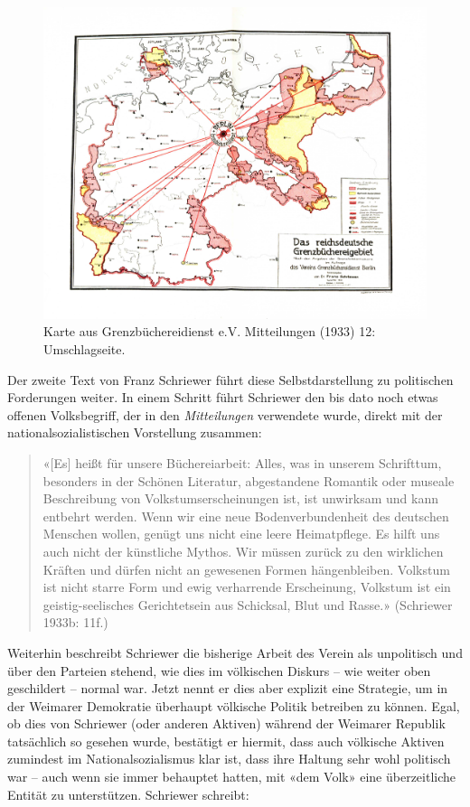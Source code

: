 \documentclass[a4paper,
fontsize=11pt,
oneside,
numbers=noperiodatend,
parskip=half-,
bibliography=totoc,
final
]{scrartcl}
\begin{document}
\begin{figure}
\centering
\includegraphics{img/karte_reichsdeutsche.jpg}
\caption{Karte aus Grenzbüchereidienst e.V. Mitteilungen (1933) 12:
Umschlagseite.}
\end{figure}

Der zweite Text von Franz Schriewer führt diese Selbstdarstellung zu
politischen Forderungen weiter. In einem Schritt führt Schriewer den bis
dato noch etwas offenen Volksbegriff, der in den \emph{Mitteilungen}
verwendete wurde, direkt mit der nationalsozialistischen Vorstellung
zusammen:

\begin{quote}
«{[}Es{]} heißt für unsere Büchereiarbeit: Alles, was in unserem
Schrifttum, besonders in der Schönen Literatur, abgestandene Romantik
oder museale Beschreibung von Volkstumserscheinungen ist, ist unwirksam
und kann entbehrt werden. Wenn wir eine neue Bodenverbundenheit des
deutschen Menschen wollen, genügt uns nicht eine leere Heimatpflege. Es
hilft uns auch nicht der künstliche Mythos. Wir müssen zurück zu den
wirklichen Kräften und dürfen nicht an gewesenen Formen hängenbleiben.
Volkstum ist nicht starre Form und ewig verharrende Erscheinung,
Volkstum ist ein geistig-seelisches Gerichtetsein aus Schicksal, Blut
und Rasse.» (Schriewer 1933b: 11f.)
\end{quote}

Weiterhin beschreibt Schriewer die bisherige Arbeit des Verein als
unpolitisch und über den Parteien stehend, wie dies im völkischen
Diskurs -- wie weiter oben geschildert -- normal war. Jetzt nennt er
dies aber explizit eine Strategie, um in der Weimarer Demokratie
überhaupt völkische Politik betreiben zu können. Egal, ob dies von
Schriewer (oder anderen Aktiven) während der Weimarer Republik
tatsächlich so gesehen wurde, bestätigt er hiermit, dass auch völkische
Aktiven zumindest im Nationalsozialismus klar ist, dass ihre Haltung
sehr wohl politisch war -- auch wenn sie immer behauptet hatten, mit
«dem Volk» eine überzeitliche Entität zu unterstützen. Schriewer
schreibt:
\end{document}
